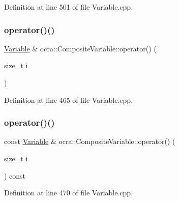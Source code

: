 Definition at line 501 of file Variable.\+cpp.

\hypertarget{classocra_1_1CompositeVariable_a6cbd2ebea33e1fd523453b9448b3fde2}{}\label{classocra_1_1CompositeVariable_a6cbd2ebea33e1fd523453b9448b3fde2} 
\subsubsection{\texorpdfstring{operator()()}{operator()()}\hspace{0.1cm}{\footnotesize\ttfamily [1/2]}}
{\footnotesize\ttfamily \hyperlink{classocra_1_1Variable}{Variable} \& ocra\+::\+Composite\+Variable\+::operator() (\begin{DoxyParamCaption}\item[{size\+\_\+t}]{i }\end{DoxyParamCaption})}



Definition at line 465 of file Variable.\+cpp.

\hypertarget{classocra_1_1CompositeVariable_ae539d99db2156258b02f6cf4474f2d94}{}\label{classocra_1_1CompositeVariable_ae539d99db2156258b02f6cf4474f2d94} 
\subsubsection{\texorpdfstring{operator()()}{operator()()}\hspace{0.1cm}{\footnotesize\ttfamily [2/2]}}
{\footnotesize\ttfamily const \hyperlink{classocra_1_1Variable}{Variable} \& ocra\+::\+Composite\+Variable\+::operator() (\begin{DoxyParamCaption}\item[{size\+\_\+t}]{i }\end{DoxyParamCaption}) const}



Definition at line 470 of file Variable.\+cpp.

\hypertarget{classocra_1_1CompositeVariable_ac2015499d8f01ee39ef7bfbe33363a10}{}\label{classocra_1_1CompositeVariable_ac2015499d8f01ee39ef7bfbe33363a10} 
